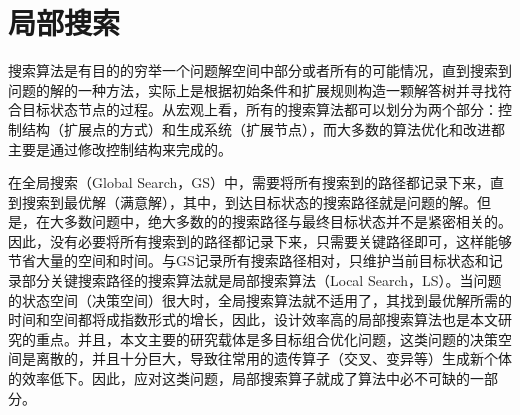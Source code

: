 \section{局部搜索}
\label{sec:背景介绍:局部搜索}
搜索算法是有目的的穷举一个问题解空间中部分或者所有的可能情况，直到搜索到问题的解的一种方法，实际上是根据初始条件和扩展规则构造一颗解答树并寻找符合目标状态节点的过程。从宏观上看，所有的搜索算法都可以划分为两个部分：控制结构（扩展点的方式）和生成系统（扩展节点），而大多数的算法优化和改进都主要是通过修改控制结构来完成的。
\par
在全局搜索（Global Search，GS）中，需要将所有搜索到的路径都记录下来，直到搜索到最优解（满意解），其中，到达目标状态的搜索路径就是问题的解。但是，在大多数问题中，绝大多数的的搜索路径与最终目标状态并不是紧密相关的。因此，没有必要将所有搜索到的路径都记录下来，只需要关键路径即可，这样能够节省大量的空间和时间。与GS记录所有搜索路径相对，只维护当前目标状态和记录部分关键搜索路径的搜索算法就是局部搜索算法（Local Search，LS）。当问题的状态空间（决策空间）很大时，全局搜索算法就不适用了，其找到最优解所需的时间和空间都将成指数形式的增长，因此，设计效率高的局部搜索算法也是本文研究的重点。并且，本文主要的研究载体是多目标组合优化问题，这类问题的决策空间是离散的，并且十分巨大，导致往常用的遗传算子（交叉、变异等）生成新个体的效率低下。因此，应对这类问题，局部搜索算子就成了算法中必不可缺的一部分。

